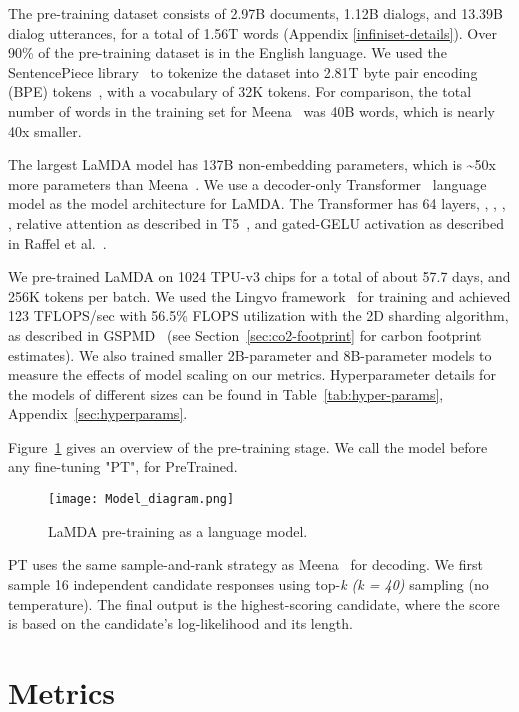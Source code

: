 \documentclass{article}
\begin{document}
The pre-training dataset consists of 2.97B documents, 1.12B dialogs, and 13.39B dialog utterances, for a total of 1.56T words (Appendix \ref{infiniset-details}). Over 90\% of the pre-training dataset is in the English language. We used the SentencePiece library~\cite{sentencepiece} to tokenize the dataset into 2.81T byte pair encoding (BPE) tokens~\cite{sennrich2015neural}, with a vocabulary of 32K tokens. For comparison, the total number of words in the training set for Meena~\cite{adiwardana2020humanlike} was 40B words, which is nearly 40x smaller. 

The largest LaMDA model has 137B non-embedding parameters, which is {\textasciitilde}50x more parameters than Meena~\cite{adiwardana2020humanlike}. We use a decoder-only Transformer~\cite{Vaswani2017AttentionIA} language model as the model architecture for LaMDA. The Transformer has 64 layers, , , , , relative attention as described in T5~\cite{t5}, and gated-GELU activation as described in Raffel et al.~\cite{shazeer2020glu}.

We pre-trained LaMDA on 1024 TPU-v3 chips for a total of about 57.7 days, and 256K tokens per batch. We used the Lingvo framework~\cite{shen2019lingvo} for training and achieved 123 TFLOPS/sec with 56.5\% FLOPS utilization with the 2D sharding algorithm, as described in GSPMD~\cite{gspmd21} (see Section~\ref{sec:co2-footprint} for carbon footprint estimates). We also trained smaller 2B-parameter and 8B-parameter models to measure the effects of model scaling on our metrics. Hyperparameter details for the models of different sizes can be found in Table~\ref{tab:hyper-params}, Appendix~\ref{sec:hyperparams}.

Figure~\ref{fig:LaMDA-pretrain} gives an overview of the pre-training stage. We call the model before any fine-tuning "PT", for PreTrained.

\begin{figure}[h!]
    \centering
\texttt{[image: Model\_diagram.png]}
    \caption{LaMDA pre-training as a language model.
    }
    \label{fig:LaMDA-pretrain}
\end{figure}

PT uses the same sample-and-rank strategy as Meena~\cite{adiwardana2020humanlike} for decoding. We first sample 16 independent candidate responses using top-\textit{k (k = 40)} sampling (no temperature). The final output is the highest-scoring candidate, where the score is based on the candidate’s log-likelihood and its length. 


\section{Metrics}
\label{sec:metric}
\end{document}
